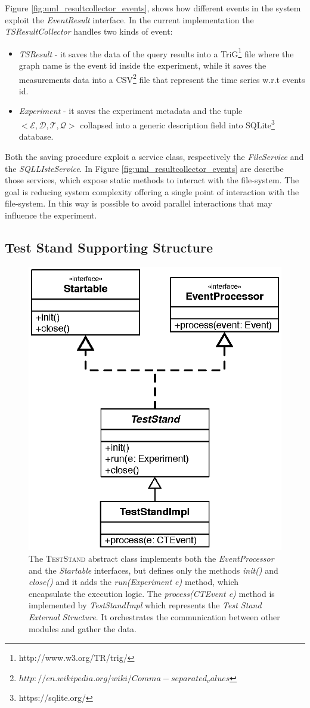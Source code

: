 Figure \ref{fig:uml_resultcollector_events}, shows how different events in the system exploit the \textit{EventResult} interface. In the current implementation the \textit{TSResultCollector} handles two kinds of event:
\begin{itemize}
\item \textit{TSResult} - it saves the data of the query results into a TriG\footnote{http://www.w3.org/TR/trig/} file where the graph name is the event id inside the experiment, while it saves the measurements data into a CSV\footnote{$http://en.wikipedia.org/wiki/Comma-separated_values$} file that represent the time series w.r.t events id. 
\item \textit{Experiment} - it saves the experiment metadata and the tuple \\ $<\mathcal{E},\mathcal{D},\mathcal{T},\mathcal{Q}>$ collapsed into a generic description field into SQLite\footnote{https://sqlite.org/} database.
\end{itemize} 

Both the saving procedure exploit a service class, respectively the \textit{FileService} and the \textit{SQLLIsteService}. In Figure \ref{fig:uml_resultcollector_events} are describe those services, which expose static methods to interact with the file-system. The goal is reducing system complexity offering a single point of interaction with the file-system. In this way is possible  to avoid parallel interactions that may influence the experiment. 


\subsection{Test Stand Supporting Structure}\label{sec:teststand-impl}


\begin{figure}[tbh]
  \centering
	\includegraphics[width=0.5\linewidth]{images/uml_teststand}
	\caption[\name \textsc{TestStand} - UML Schema]{The \textsc{TestStand} abstract class implements both the \textit{EventProcessor} and the \textit{Startable} interfaces, but defines only the methods \textit{init()} and \textit{close()}  and it adds the \textit{run(Experiment e)} method, which encapsulate the execution logic. The \textit{process(CTEvent e)} method is implemented by \textit{TestStandImpl} which represents the \textit{Test Stand External Structure}. It orchestrates the communication between other modules and gather the data.}
  	\label{fig:uml_teststand}
\end{figure}


